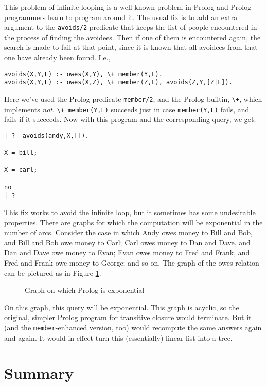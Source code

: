 This problem of infinite looping is a well-known problem in Prolog and
Prolog programmers learn to program around it.  The usual fix is to
add an extra argument to the \verb|avoids/2| predicate that keeps the
list of people encountered in the process of finding the avoidees.
Then if one of them is encountered again, the search is made to fail
at that point, since it is known that all avoidees from that one have
already been found.  I.e.,
\begin{verbatim}
avoids(X,Y,L) :- owes(X,Y), \+ member(Y,L).
avoids(X,Y,L) :- owes(X,Z), \+ member(Z,L), avoids(Z,Y,[Z|L]).
\end{verbatim}
Here we've used the Prolog predicate \verb|member/2|, and the Prolog
builtin, \verb|\+|, which implements {\em not}.  \verb|\+ member(Y,L)|
succeeds just in case \verb|member(Y,L)| fails, and fails if it
succeeds.  Now with this program and the corresponding query, we get:
\begin{verbatim}
| ?- avoids(andy,X,[]).

X = bill;

X = carl;

no
| ?- 
\end{verbatim}
This fix works to avoid the infinite loop, but it sometimes has some
undesirable properties.  There are graphs for which the computation
will be exponential in the number of arcs.  Consider the case in which
Andy owes money to Bill and Bob, and Bill and Bob owe money to Carl;
Carl owes money to Dan and Dave, and Dan and Dave owe money to Evan;
Evan owes money to Fred and Frank, and Fred and Frank owe money to
George; and so on. The graph of the owes relation can be pictured as
in Figure \ref{expgraph}.
\begin{figure}
\centerline{}
\caption{Graph on which Prolog is exponential}\label{expgraph}
\end{figure}
On this graph, this query will be exponential.  This graph is acyclic,
so the original, simpler Prolog program for transitive closure would
terminate.  But it (and the \verb|member|-enhanced version, too) would
recompute the same answers again and again.  It would in effect turn
this (essentially) linear list into a tree.

\section{Summary}

